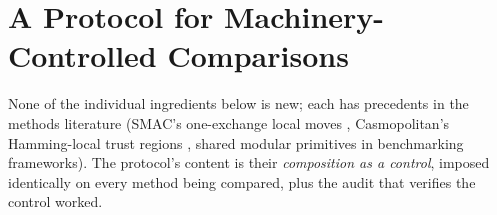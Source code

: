\documentclass[%
 aip,
 amsmath,amssymb,
 floatfix,
 reprint,%
]{revtex4-1}
\begin{document}
\section{A Protocol for Machinery-Controlled Comparisons}

\label{sec:protocol}

None of the individual ingredients below is new; each has precedents in
the methods literature (SMAC's one-exchange local moves
\cite{hutter2011sequential}, Casmopolitan's Hamming-local trust regions
\cite{wan2021think}, shared modular primitives in benchmarking
frameworks). The protocol's content is their \emph{composition as a
control}, imposed identically on every method being compared, plus the
audit that verifies the control worked.
\end{document}
